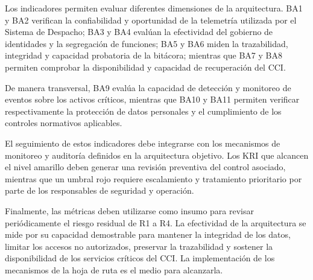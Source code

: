 Los indicadores permiten evaluar diferentes dimensiones de la arquitectura. BA1 y BA2
verifican la confiabilidad y oportunidad de la telemetría utilizada por el Sistema de Despacho;
BA3 y BA4 evalúan la efectividad del gobierno de identidades y la segregación de funciones;
BA5 y BA6 miden la trazabilidad, integridad y capacidad probatoria de la bitácora; mientras que
BA7 y BA8 permiten comprobar la disponibilidad y capacidad de recuperación del CCI.

De manera transversal, BA9 evalúa la capacidad de detección y monitoreo de eventos sobre los
activos críticos, mientras que BA10 y BA11 permiten verificar respectivamente la protección de
datos personales y el cumplimiento de los controles normativos aplicables.

El seguimiento de estos indicadores debe integrarse con los mecanismos de monitoreo y
auditoría definidos en la arquitectura objetivo. Los KRI que alcancen el nivel amarillo deben
generar una revisión preventiva del control asociado, mientras que un umbral rojo requiere
escalamiento y tratamiento prioritario por parte de los responsables de seguridad y operación.

Finalmente, las métricas deben utilizarse como insumo para revisar periódicamente el riesgo
residual de R1 a R4. La efectividad de la arquitectura se mide por su capacidad
demostrable para mantener la integridad de los datos, limitar los accesos no autorizados, preservar
la trazabilidad y sostener la disponibilidad de los servicios críticos del CCI. La implementación
de los mecanismos de la hoja de ruta es el medio para alcanzarla.